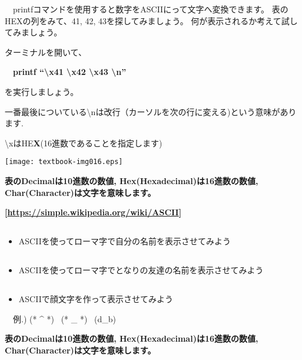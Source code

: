 \ \ printfコマンドを使用すると数字をASCIIにって文字へ変換できます。
表のHEXの列をみて、41, 42, 43を探してみましょう。
何が表示されるか考えて試してみましょう。

ターミナルを開いて、

\ \ \textbf{printf “{\textbackslash}x41 {\textbackslash}x42 {\textbackslash}x43 {\textbackslash}n”}

を実行しましょう。

一番最後についている{\textbackslash}nは改行（カーソルを次の行に変える)という意味があります.

{\textbackslash}xはHE\textbf{X}(16進数であることを指定します)

\begin{center}
  \texttt{[image: textbook-img016.eps]}
\end{center}

{\bfseries
表のDecimalは10進数の数値,
Hex(Hexadecimal)は16進数の数値,
Char(Character)は文字を意味します。}

{\bfseries
[\url{https://simple.wikipedia.org/wiki/ASCII}]}

\clearpage
\subsection*{\theQuestion\label{Q:myName}}
\begin{itemize}
  \item ASCIIを使ってローマ字で自分の名前を表示させてみよう
\end{itemize}
\subsection*{\theQuestion\label{Q:friendName}}
\begin{itemize}
  \item ASCIIを使ってローマ字でとなりの友達の名前を表示させてみよう
\end{itemize}
\subsection*{\theQuestion\label{Q:emoticon}}
\begin{itemize}
\item ASCIIで顔文字を作って表示させてみよう
\end{itemize}
\ \ 例.) (* \^{} *) \ (* \_ *) \ (d\_b)

{\bfseries
表のDecimalは10進数の数値,
Hex(Hexadecimal)は16進数の数値,
Char(Character)は文字を意味します。}


